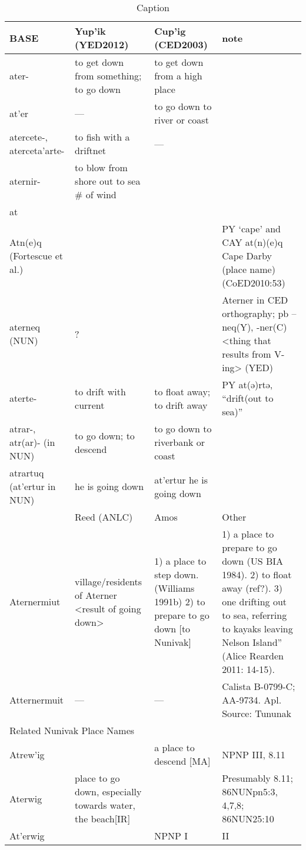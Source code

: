 \begin{sidewaystable}[h]
    \centering\small
    \begin{tabular}{p{2cm} | p{3cm} | p{3cm} | p{6cm}}
BASE & Yup’ik (YED2012) & Cup’ig (CED2003) & note \\
\hline
ater-&to get down from something; to go down&to get down from a high place& \\
at’er & --- & to go down to river or coast & \\
atercete-, aterceta’arte- &to fish with a driftnet& --- & \\
aternir-&to blow from shore out to sea \# of wind&& \\
at &&& \\
Atn(e)q (Fortescue et al.)&&&PY ‘cape’ and CAY at(n)(e)q Cape Darby (place name) (CoED2010:53) \\
aterneq (NUN)&?&&Aterner in CED orthography; pb –neq(Y), -ner(C) <thing that results from V-ing> (YED) \\
aterte-&to drift with current&to float away; to drift away&PY at(ə)rtə, “drift(out to sea)” \\
atrar-, atr(ar)- (in NUN)&to go down; to descend&to go down to riverbank or coast&  \\
atrartuq (at’ertur in NUN) &he is going down&at’ertur he is going down& \\

&Reed (ANLC)&Amos &Other \\

Aternermiut&village/residents of Aterner <result of going down>&1) a place to step down. (Williams 1991b)
2) to prepare to go down [to Nunivak]&1) a place to prepare to go down (US BIA 1984).
2) to float away (ref?).
3) one drifting out to sea, referring to kayaks leaving Nelson Island” (Alice Rearden 2011: 14-15). \\
Atternermuit& --- & --- &Calista B-0799-C; AA-9734. Apl. Source: Tununak\\


\multicolumn{4}{l}{Related Nunivak Place Names} \\ \hline
Atrew’ig && a place to descend [MA]&NPNP III, 8.11 \\
Aterwig&place to go down, especially towards water, the beach[IR]&&Presumably 8.11; 86NUNpn5:3, 4,7,8; 86NUN25:10 \\
At'erwig&&NPNP I & II \\

    \end{tabular}
    \caption{Caption}
    \label{tab:my_label}
\end{sidewaystable}

